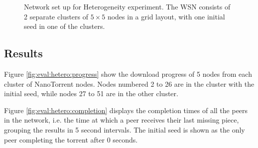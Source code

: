 \begin{figure}
    \caption[Network set up for Heterogeneity experiment]{Network set up for Heterogeneity experiment. The \gls{WSN} consists of 2 separate clusters of $5 \times 5$ nodes in a grid layout, with one initial seed in one of the clusters.}
    \label{fig:eval:hetero:setup}
\end{figure}

\subsection{Results}
Figure \ref{fig:eval:hetero:progress} show the download progress of 5 nodes from each cluster of NanoTorrent nodes. Nodes numbered 2 to 26 are in the cluster with the initial seed, while nodes 27 to 51 are in the other cluster.

Figure \ref{fig:eval:hetero:completion} displays the completion times of all the peers in the network, i.e. the time at which a peer receives their last missing piece, grouping the results in 5 second intervals. The initial seed is shown as the only peer completing the torrent after 0 seconds.

